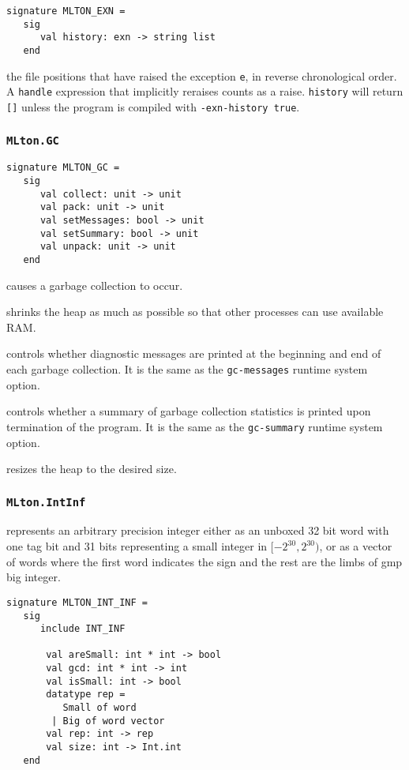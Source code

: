 \begin{verbatim}
signature MLTON_EXN =
   sig
      val history: exn -> string list
   end
\end{verbatim}

\begin{description}

the file positions that have raised the exception {\tt e}, in reverse
chronological order.   A {\tt handle} expression that implicitly reraises counts
as a raise.  {\tt history} will return {\tt []} unless the program is compiled
with {\tt -exn-history true}.

\end{description}

\subsubsection{{\tt MLton.GC}}
\begin{verbatim}
signature MLTON_GC =
   sig
      val collect: unit -> unit
      val pack: unit -> unit
      val setMessages: bool -> unit
      val setSummary: bool -> unit
      val unpack: unit -> unit
   end
\end{verbatim}

\begin{description}
causes a garbage collection to occur.

shrinks the heap as much as possible so that other processes can use available
RAM.

controls whether diagnostic messages are
printed at the beginning and end of each garbage collection.  It is
the same as the {\tt gc-messages} runtime system option.

controls whether a summary of garbage
collection statistics is printed upon termination of the program.  It
is the same as the {\tt gc-summary} runtime system option.

resizes the heap to the desired size.

\end{description}

\subsubsection{{\tt MLton.IntInf}}

{\mlton} represents an arbitrary precision integer either as an
unboxed 32 bit word with one tag bit and 31 bits representing a small
integer in $[-2^{30}, 2^{30})$, or as a vector of words where the
first word indicates the sign and the rest are the limbs of gmp big
integer.
\begin{verbatim}
signature MLTON_INT_INF =
   sig
      include INT_INF

       val areSmall: int * int -> bool
       val gcd: int * int -> int 
       val isSmall: int -> bool
       datatype rep =
          Small of word
        | Big of word vector
       val rep: int -> rep
       val size: int -> Int.int
   end
\end{verbatim}

